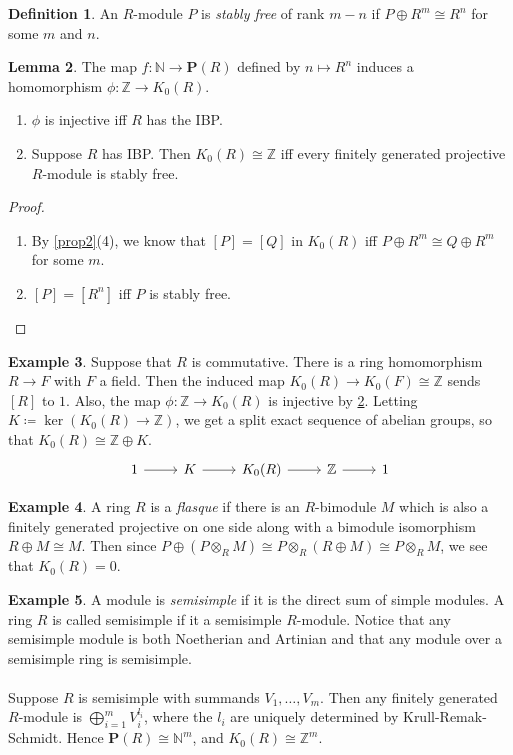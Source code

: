 \documentclass[10pt,letterpaper,cm]{nupset}
\theoremstyle{definition}
\newtheorem{definition}{Definition}
\newtheorem{exmp}[definition]{Example}
\theoremstyle{theorem}
\newtheorem{lemma}[definition]{Lemma}
\theoremstyle{remark}
\newcommand{\N}{\mathbb N}
\renewcommand{\P}{\mathbf P}
\newcommand{\Z}{\mathbb Z}
\newcommand{\1}{\mathbf{1}}
\newcommand{\0}{\vec 0}
\begin{document}
\begin{definition}
An $R$-module $P$ is \textit{stably free} of rank $m-n$ if $P \oplus R^m \cong R^n$ for some $m$ and $n$.
\end{definition}

\begin{lemma}\label{L4}
The map $f: \N \to \P(R)$ defined by $n \mapsto R^n$ induces a homomorphism $\phi : \Z \to K_0(R)$.
\begin{enumerate}
\item $\phi$ is injective iff $R$ has the IBP.
\item Suppose $R$ has IBP. Then $K_0(R) \cong \Z$ iff every finitely generated projective $R$-module is stably free.
\end{enumerate}
\end{lemma}
\begin{proof} $ $
\begin{enumerate}
\item By \cref{prop2}(4), we know that $[P] = [Q]$ in $K_0(R)$ iff $P\oplus R^m \cong Q\oplus R^m$ for some $m$. 
\item $[P]= [R^n]$ iff $P$ is stably free.
\end{enumerate}
\end{proof}


\begin{exmp}
Suppose that $R$ is commutative. There is a ring homomorphism $R\to F$ with $F$ a field. Then the induced map $K_0(R) \to K_0(F) \cong \Z$ sends $[R]$ to $1$. Also, the map $\phi : \Z \to K_0(R)$ is injective by \cref{L4}. Letting $K\coloneqq \ker(K_0(R) \to \Z)$, we get a split exact sequence of abelian groups, so that $K_0(R) \cong \Z \oplus K$.
\[
\begin{tikzcd}
1 \arrow[r] & K \arrow[r] & K_0(R) \arrow[r] & \mathbb Z \arrow[r] & 1
\end{tikzcd}
\]
\end{exmp}

\begin{exmp}
A ring $R$ is a \textit{flasque} if there is an $R$-bimodule $M$ which is also a finitely generated projective on one side along with a bimodule isomorphism $R\oplus M \cong M$. Then since $P \oplus (P \otimes_R M) \cong P \otimes_R (R \oplus M) \cong P \otimes_R M$, we see that $K_0(R) =0$.
\end{exmp}

\begin{exmp}
A module is \textit{semisimple} if it is the direct sum of simple modules. A ring $R$ is called semisimple if it a semisimple $R$-module. Notice that any semisimple module is both Noetherian and Artinian and that any module over a semisimple ring is semisimple. \\ \\ Suppose $R$ is semisimple with summands $V_1, \ldots, V_m$. Then any finitely generated $R$-module is $\bigoplus_{i=1}^m V_i^{l_i}$, where the $l_i$ are uniquely determined by Krull-Remak-Schmidt. Hence $\P(R) \cong \N^m$, and $K_0(R) \cong \Z^m$.
\end{exmp}
\end{document}
